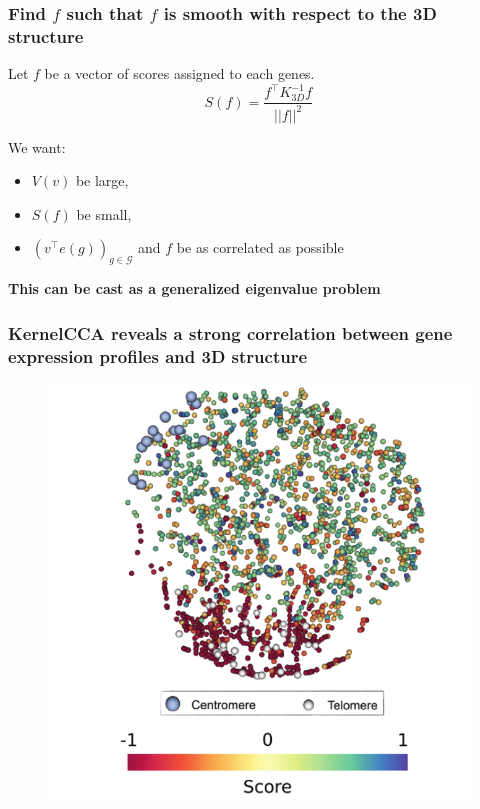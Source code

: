 \documentclass[xcolor=dvipsnames]{beamer}
\begin{document}
\begin{frame}
\frametitle{Find $f$ such that $f$ is smooth with respect to the 3D structure}
Let $f$ be a vector of scores assigned to each genes. \\
\begin{equation*}\label{eq:smoothness}
S(f) = \frac{f^\top K^{-1}_{3D} f}{||f||^2}\,
\end{equation*}

\vspace{1em}
We want:
\begin{itemize}[label={$\bullet$}]
\item $V(v)$ be large,
\item $S(f)$ be small,
\item $\left(v^\top e(g)\right)_{g\in\mathcal{G}}$ and $f$ be as correlated as possible
\end{itemize}

\vspace{1em}
\begin{center}
{\color{Blue} \bf This can be cast as a generalized eigenvalue problem}
\end{center}

\end{frame}


\begin{frame}
\frametitle{KernelCCA reveals a strong correlation between gene expression
profiles and 3D structure}
\begin{figure}
\begin{center}
\includegraphics[width=0.6\linewidth]{figures/test.png}
\end{center}
\end{figure}
\end{frame}
\end{document}
